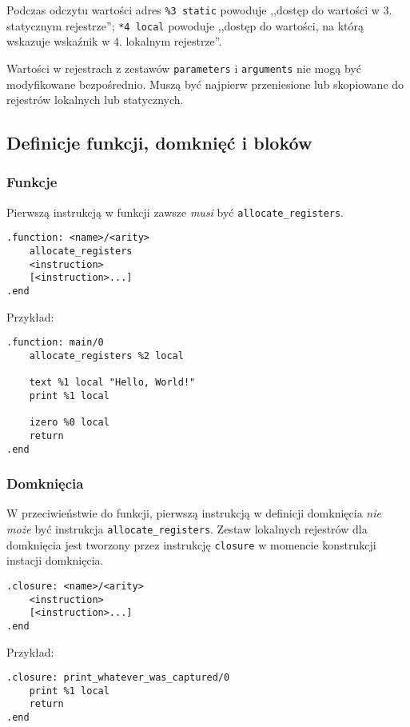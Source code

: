 Podczas odczytu wartości adres \texttt{\%3 static} powoduje ,,dostęp do wartości w 3. statycznym rejestrze'';
\texttt{*4 local} powoduje ,,dostęp do wartości, na którą wskazuje wskaźnik w 4. lokalnym rejestrze''.

Wartości w rejestrach z zestawów \texttt{parameters} i \texttt{arguments} nie mogą być modyfikowane
bezpośrednio. Muszą być najpierw przeniesione lub skopiowane do rejestrów lokalnych lub statycznych.

\subsection{Definicje funkcji, domknięć i bloków}

\subsubsection{Funkcje}

Pierwszą instrukcją w funkcji zawsze \emph{musi} być \texttt{allocate\_registers}.
\begin{lstlisting}
.function: <name>/<arity>
    allocate_registers
	<instruction>
	[<instruction>...]
.end
\end{lstlisting}

Przykład:
\begin{lstlisting}
.function: main/0
    allocate_registers %2 local

    text %1 local "Hello, World!"
    print %1 local

    izero %0 local
    return
.end
\end{lstlisting}

\subsubsection{Domknięcia}

W przeciwieństwie do funkcji, pierwszą instrukcją w definicji domknięcia
\emph{nie może} być instrukcja \texttt{allocate\_registers}. Zestaw lokalnych
rejestrów dla domknięcia jest tworzony przez instrukcję \texttt{closure} w
momencie konstrukcji instacji domknięcia.
\begin{lstlisting}
.closure: <name>/<arity>
	<instruction>
	[<instruction>...]
.end
\end{lstlisting}

Przykład:
\begin{lstlisting}
.closure: print_whatever_was_captured/0
    print %1 local
    return
.end
\end{lstlisting}

